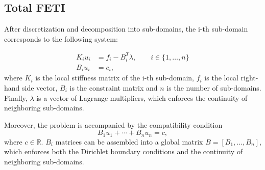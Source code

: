 \subsection{Total FETI}
After discretization and decomposition into sub-domains, the i-th
sub-domain corresponds to the following system: 

\begin{align}
K_i u_i &= f_i - B_i^T \lambda, \qquad i \in \{ 1, \ldots, n \}\\
B_i u_i &= c_i,
\label{eq:tfetiLocalProblem}
\end{align}
where $K_i$ is the local stiffness matrix of the i-th sub-domain, 
$f_i$ is the local right-hand side vector, $B_i$ is the constraint matrix and $n$ is the number of 
sub-domains. Finally, $\lambda$ is a vector of Lagrange 
multipliers, which enforces the continuity of neighboring 
sub-domains.


Moreover, the problem is accompanied by the compatibility 
condition
\begin{equation}
B_1 u_1 + \cdots + B_n u_n = c,
\end{equation}
where $c \in \mathbb{R}$. $B_i$ matrices can be assembled into 
a global matrix $B = \left[ B_1, \ldots, B_n \right]$, which enforces both the Dirichlet boundary conditions and the continuity of neighboring sub-domains.%

